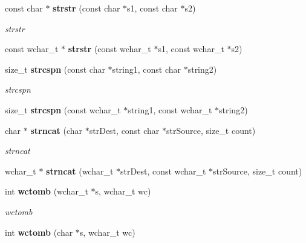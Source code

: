 \begin{DoxyCompactItemize}
\item 
const char $\ast$ {\bf strstr} (const char $\ast$s1, const char $\ast$s2)\label{namespacestring__util_a38b1bffbbcea43e28d6f821a69f89a4b}

\begin{DoxyCompactList}\small\item\em strstr \end{DoxyCompactList}\item 
const wchar\+\_\+t $\ast$ {\bfseries strstr} (const wchar\+\_\+t $\ast$s1, const wchar\+\_\+t $\ast$s2)\label{namespacestring__util_aee6bbad266f06165b7e306039b73ba6d}

\item 
size\+\_\+t {\bf strcspn} (const char $\ast$string1, const char $\ast$string2)\label{namespacestring__util_a9d8e7142b076ef57e4dc89f329c828fe}

\begin{DoxyCompactList}\small\item\em strcspn \end{DoxyCompactList}\item 
size\+\_\+t {\bfseries strcspn} (const wchar\+\_\+t $\ast$string1, const wchar\+\_\+t $\ast$string2)\label{namespacestring__util_a2ec3237ea3ddec88e683b0b418383b27}

\item 
char $\ast$ {\bf strncat} (char $\ast$str\+Dest, const char $\ast$str\+Source, size\+\_\+t count)\label{namespacestring__util_a215cc7e648621d719631efdb01b6d273}

\begin{DoxyCompactList}\small\item\em strncat \end{DoxyCompactList}\item 
wchar\+\_\+t $\ast$ {\bfseries strncat} (wchar\+\_\+t $\ast$str\+Dest, const wchar\+\_\+t $\ast$str\+Source, size\+\_\+t count)\label{namespacestring__util_aaafd341e0b88e2a0241e009da695c712}

\item 
int {\bf wctomb} (wchar\+\_\+t $\ast$s, wchar\+\_\+t wc)\label{namespacestring__util_a5d1ce3a13f15c1bbbccdc8120e9f2ee3}

\begin{DoxyCompactList}\small\item\em wctomb \end{DoxyCompactList}\item 
int {\bfseries wctomb} (char $\ast$s, wchar\+\_\+t wc)\label{namespacestring__util_ac014cd94ca1a47bde507f4dcc2057172}


\end{DoxyCompactItemize}
